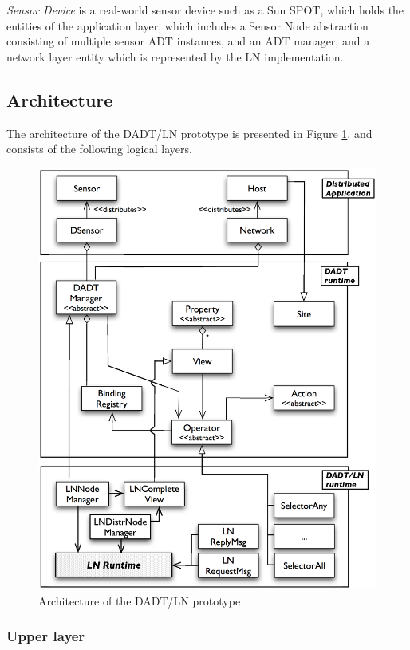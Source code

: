 \emph{Sensor Device} is a real-world sensor device such as a Sun SPOT, 
which holds the entities of the application layer, which includes a Sensor Node
abstraction consisting of multiple sensor ADT instances, and an ADT
manager, and a network layer entity which is represented by the LN implementation.

\subsection{Architecture}

The architecture of the DADT/LN prototype is presented in Figure
\ref{Fig:DADTLN_architecture}, and consists of the following logical layers.

\begin{figure}
\centering
\includegraphics[scale=0.65]{img/DADTLN_architecture.eps} 
\caption[DADT/LN architecture]{Architecture of the DADT/LN prototype}
\label{Fig:DADTLN_architecture}
\end{figure} 

\subsubsection{Upper layer}

